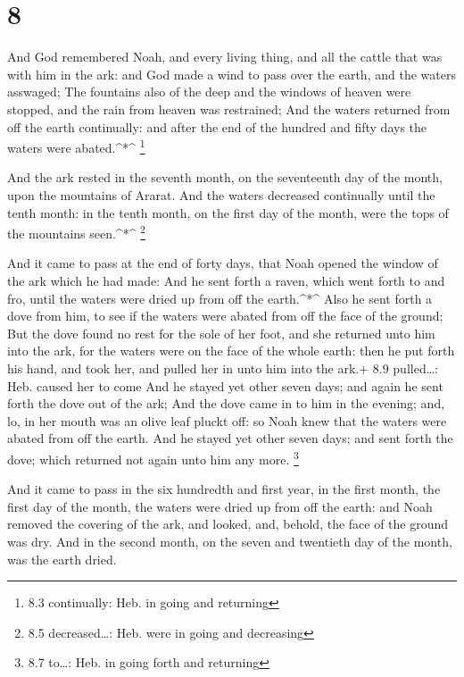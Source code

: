 \hypertarget{section-7}{%
\section{8}\label{section-7}}

 And God remembered Noah, and every living thing, and all
the cattle that was with him in the ark: and God made a wind to pass
over the earth, and the waters asswaged;  The fountains also
of the deep and the windows of heaven were stopped, and the rain from
heaven was restrained;  And the waters returned from off the
earth continually: and after the end of the hundred and fifty days the
waters were abated.\^{}*\^{} \footnote{8.3 continually: Heb. in going
  and returning}

 And the ark rested in the seventh month, on the seventeenth
day of the month, upon the mountains of Ararat.  And the
waters decreased continually until the tenth month: in the tenth month,
on the first day of the month, were the tops of the mountains
seen.\^{}*\^{} \footnote{8.5 decreased\ldots: Heb. were in going and
  decreasing}

 And it came to pass at the end of forty days, that Noah
opened the window of the ark which he had made:  And he sent
forth a raven, which went forth to and fro, until the waters were dried
up from off the earth.\^{}*\^{}  Also he sent forth a dove
from him, to see if the waters were abated from off the face of the
ground;  But the dove found no rest for the sole of her
foot, and she returned unto him into the ark, for the waters were on the
face of the whole earth: then he put forth his hand, and took her, and
pulled her in unto him into the ark.+ 8.9 pulled\ldots: Heb. caused her
to come  And he stayed yet other seven days; and again he
sent forth the dove out of the ark;  And the dove came in
to him in the evening; and, lo, in her mouth was an olive leaf pluckt
off: so Noah knew that the waters were abated from off the earth.
 And he stayed yet other seven days; and sent forth the
dove; which returned not again unto him any more. \footnote{8.7
  to\ldots: Heb. in going forth and returning}

 And it came to pass in the six hundredth and first year,
in the first month, the first day of the month, the waters were dried up
from off the earth: and Noah removed the covering of the ark, and
looked, and, behold, the face of the ground was dry.  And
in the second month, on the seven and twentieth day of the month, was
the earth dried.


